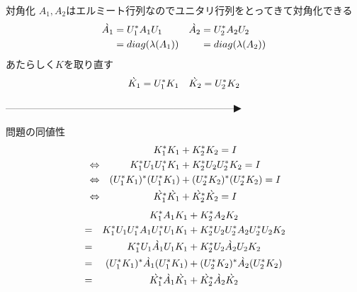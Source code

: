 \documentclass[./choro]{subfiles}
\begin{document}
\begin{minipage}{0.3\hsize}
    
\end{minipage}
\begin{minipage}{0.35\hsize}
    \vspace{2cm}
    \begin{itembox}[l]{対角化}
        $A_1,A_2$はエルミート行列なのでユニタリ行列をとってきて対角化できる
        \begin{align*}
            \grave{A_1} &= U^{\ast}_1 A_1 U_1 &
            \grave{A_2} &= U^{\ast}_2 A_2 U_2 \\
                   &= diag(\lambda(A_1)) &
                   &= diag(\lambda(A_2)) \\
        \end{align*}
        あたらしく$K$を取り直す
        \begin{align*}
            \grave{K_1} &= U^{\ast}_1 K_1        &
            \grave{K_2} &= U^{\ast}_2 K_2        \\
        \end{align*}
    \end{itembox}
        ---------------------------------------------------------------------▶
    \begin{itembox}[l]{問題の同値性}
        \begin{align*}
            &               & K^{\ast}_1 K_1 &+
                              K^{\ast}_2 K_2 = I \\
            &\Leftrightarrow& K^{\ast}_1 U_1U^{\ast}_1 K_1 &+
                              K^{\ast}_2 U_2U^{\ast}_2K_2 = I \\
            &\Leftrightarrow& (U^{\ast}_1K_1)^{\ast} (U^{\ast}_1 K_1) &+ 
                              (U^{\ast}_2K_2)^{\ast} (U^{\ast}_2 K_2) = I \\
            &\Leftrightarrow& \grave{K^{\ast}_1} \grave{K_1} &+ \grave{K^{\ast}_2} \grave{K_2} = I
        \end{align*}
        \begin{align*}
            &  & K^{\ast}_1 A_1 K_1 &+ K^{\ast}_2 A_2 K_2  \\
            &= & K^{\ast}_1 U_1U^{\ast}_1 A_1 U^{\ast}_1U_1 K_1 &+
                 K^{\ast}_2 U_2U^{\ast}_2 A_2 U^{\ast}_2U_2 K_2  \\
            &= & K^{\ast}_1 U_1 \grave{A_1}U_1 K_1 &+
                 K^{\ast}_2 U_2 \grave{A_2}U_2 K_2  \\
            &= & (U^{\ast}_1K_1)^{\ast} \grave{A_1} (U^{\ast}_1 K_1) &+ 
                 (U^{\ast}_2K_2)^{\ast} \grave{A_2} (U^{\ast}_2 K_2) \\
            &= & \grave{K^{\ast}_1} \grave{A_1} \grave{K_1} &+ \grave{K^{\ast}_2} \grave{A_2} \grave{K_2} 
        \end{align*}
    \end{itembox}
\end{minipage}
\begin{minipage}{0.3\hsize}
    
\end{minipage}
\end{document}
